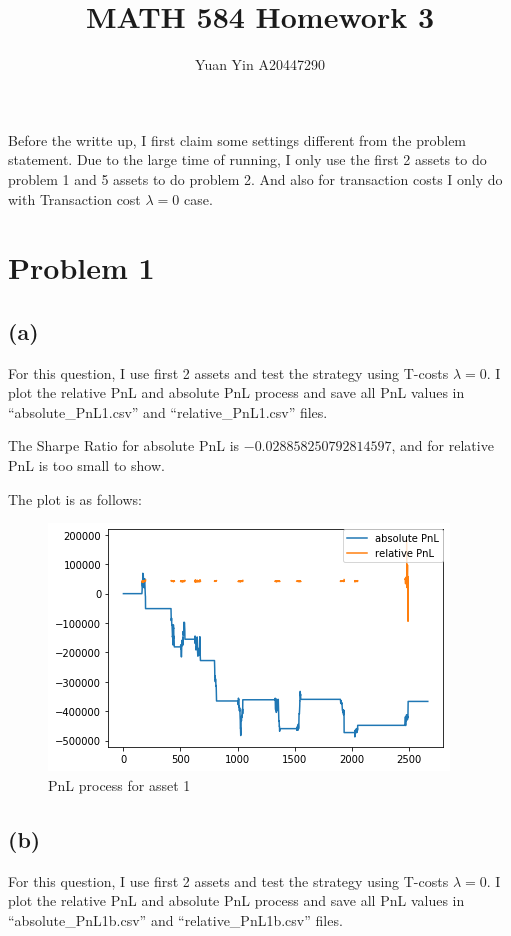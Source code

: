 \documentclass[letterpaper,11pt]{article}
\author{Yuan Yin A20447290}
\title{MATH 584 Homework 3}
\begin{document}
\large
\maketitle
\begin{spacing}{1.2}  %

Before the writte up, I first claim some settings different from the problem statement. Due to the large time of running, I only use the first 2 assets to do problem 1 and 5 assets to do problem 2. And also for transaction costs I only do with Transaction cost $\lambda = 0$ case.

\section*{Problem 1}
\subsection*{(a)}
For this question, I use first 2 assets and test the strategy using T-costs $\lambda = 0$. I plot the relative PnL and absolute PnL process and save all PnL values in ``absolute\_PnL1.csv'' and ``relative\_PnL1.csv'' files.

The Sharpe Ratio for absolute PnL is $-0.028858250792814597$, and for relative PnL is too small to show.

The plot is as follows:
\begin{figure}[h] %
\centering
\includegraphics[scale=0.5]{1a pnl.png}
\caption{PnL process for asset 1}
\label{fig:label}
\end{figure}

\subsection*{(b)}
For this question, I use first 2 assets and test the strategy using T-costs $\lambda = 0$. I plot the relative PnL and absolute PnL process and save all PnL values in ``absolute\_PnL1b.csv'' and ``relative\_PnL1b.csv'' files.


\end{spacing}
\end{document}

